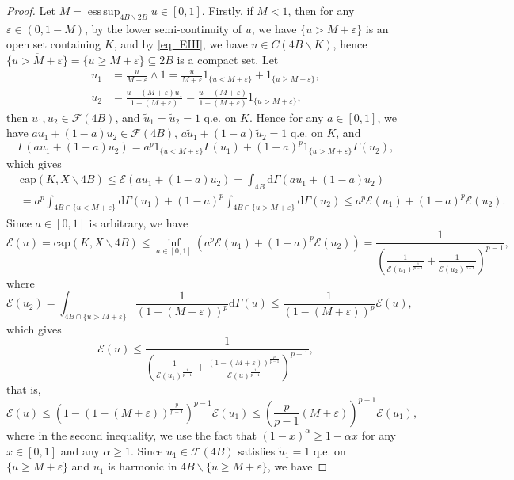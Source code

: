 \documentclass[11pt,a4paper]{article}
\numberwithin{equation}{section}
\newcommand{\esup}{\operatorname*{ess\,sup}}
\theoremstyle{plain}
\theoremstyle{definition}
\begin{document}
\begin{proof}
Let $M=\esup_{4B\backslash {2B}}u\in[0,1]$. Firstly, if $M<1$, then for any $\varepsilon\in(0,1-M)$, by the lower semi-continuity of $u$, we have $\{u>M+\varepsilon\}$ is an open set containing $K$, and by \ref{eq_EHI}, we have $u\in C(4B\backslash K)$, hence $\overline{\{u>M+\varepsilon\}}=\{u\ge M+\varepsilon\}\subseteq 2B$ is a compact set. Let
\begin{align*}
u_1&=\frac{u}{M+\varepsilon}\wedge 1=\frac{u}{M+\varepsilon}1_{\{u< M+\varepsilon\}}+1_{\{u\ge M+\varepsilon\}},\\
u_2&=\frac{u-(M+\varepsilon)u_1}{1-(M+\varepsilon)}=\frac{u-(M+\varepsilon)}{1-(M+\varepsilon)}1_{\{u>M+\varepsilon\}},
\end{align*}
then $u_1,u_2\in \mathcal{F}(4B)$, and $\widetilde{u}_1=\widetilde{u}_2=1$ q.e. on $K$. Hence for any $a\in[0,1]$, we have $au_1+(1-a)u_2\in \mathcal{F}(4B)$, $a \widetilde{u}_1+(1-a)\widetilde{u}_2=1$ q.e. on $K$, and
$$\Gamma \left(au_1+(1-a)u_2\right)=a^p1_{\{u< M+\varepsilon\}}\Gamma(u_1)+(1-a)^p1_{\{u>M+\varepsilon\}}\Gamma(u_2),$$
which gives
\begin{align*}
&\mathrm{cap}\left(K,X\backslash 4B\right)\le \mathcal{E}(au_1+(1-a)u_2)=\int_{4B}\mathrm{d}\Gamma\left(au_1+(1-a)u_2\right)\\
&=a^p\int_{4B\cap\{u< M+\varepsilon\}}\mathrm{d}\Gamma(u_1)+(1-a)^p\int_{4B\cap\{u>M+\varepsilon\}}\mathrm{d}\Gamma(u_2)\le a^p \mathcal{E}(u_1)+(1-a)^p \mathcal{E}(u_2).
\end{align*}
Since $a\in[0,1]$ is arbitrary, we have
$$\mathcal{E}(u)=\mathrm{cap}\left(K,X\backslash 4B\right)\le \inf_{a\in[0,1]}\left(a^p \mathcal{E}(u_1)+(1-a)^p \mathcal{E}(u_2)\right)=\frac{1}{\left(\frac{1}{\mathcal{E}(u_1)^{\frac{1}{p-1}}}+\frac{1}{\mathcal{E}(u_2)^{\frac{1}{p-1}}}\right)^{p-1}},$$
where
$$\mathcal{E}(u_2)=\int_{4B\cap \{u>M+\varepsilon\}}\frac{1}{(1-(M+\varepsilon))^p}\mathrm{d}\Gamma(u)\le \frac{1}{(1-(M+\varepsilon))^p}\mathcal{E}(u),$$
which gives
$$\mathcal{E}(u)\le\frac{1}{\left(\frac{1}{\mathcal{E}(u_1)^{\frac{1}{p-1}}}+\frac{(1-(M+\varepsilon))^{\frac{p}{p-1}}}{\mathcal{E}(u)^{\frac{1}{p-1}}}\right)^{p-1}},$$
that is,
$$\mathcal{E}(u)\le \left(1-\left(1-(M+\varepsilon)\right)^{\frac{p}{p-1}}\right)^{p-1}\mathcal{E}(u_1)\le \left(\frac{p}{p-1}(M+\varepsilon)\right)^{p-1}\mathcal{E}(u_1),$$
where in the second inequality, we use the fact that $(1-x)^\alpha\ge 1-\alpha x$ for any $x\in[0,1]$ and any $\alpha\ge1$. Since $u_1\in \mathcal{F}(4B)$ satisfies $\widetilde{u}_1=1$ q.e. on ${\{u\ge M+\varepsilon\}}$ and $u_1$ is harmonic in $4B\backslash {\{u\ge M+\varepsilon\}}$, we have

\end{proof}
\end{document}
